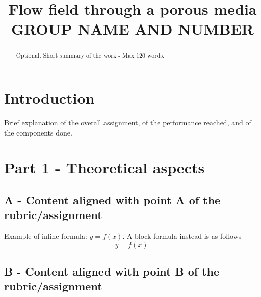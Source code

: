 \documentclass[conference,compsoc]{IEEEtran}
\begin{document}
%
\title{Flow field through a porous media\\
GROUP NAME AND NUMBER}


\author{
\and
{}
\and
{}
}


\maketitle
\thispagestyle{plain}
\pagestyle{plain}

\begin{abstract}
Optional. Short summary of the work - Max 120 words.
\end{abstract}





\section{Introduction}
Brief explanation of the overall assignment, of the performance reached, and of the components done.

\section{Part 1 - Theoretical aspects}

\subsection*{A - Content aligned with point A of the rubric/assignment}

Example of inline formula: $y = f(x)$. A block formula instead is as follows
\begin{equation}
    y = f(x).
\end{equation}

\subsection*{B - Content aligned with point B of the rubric/assignment}
\end{document}
